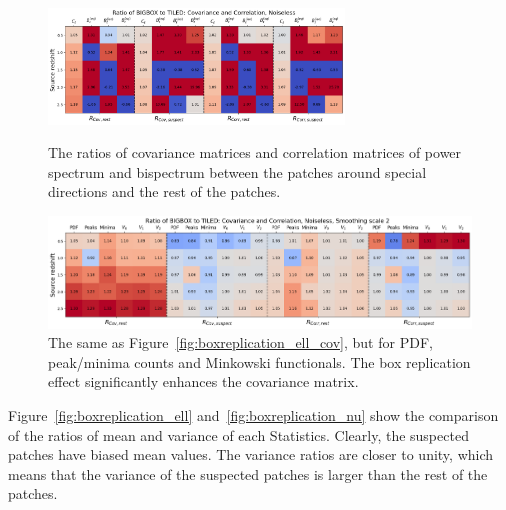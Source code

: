 \begin{figure}[ht]
    \centering
    \includegraphics[width=0.7\textwidth]{figures/BR/BR_ratio_ell_cov.png}
    \caption{The ratios of covariance matrices and correlation matrices of power spectrum and bispectrum between the patches around special directions and the rest of the patches. }
    \label{fig:boxreplication_ell_cov}
    \includegraphics[width=\textwidth]{figures/BR/BR_ratio_nu_cov.png}
    \caption{The same as Figure~\ref{fig:boxreplication_ell_cov}, but for PDF, peak/minima counts and Minkowski functionals. The box replication effect significantly enhances the covariance matrix.}
    \label{fig:boxreplication_nu_cov}
\end{figure}

Figure~\ref{fig:boxreplication_ell} and~\ref{fig:boxreplication_nu} show the comparison of the ratios of mean and variance of each Statistics. Clearly, the suspected patches have biased mean values. The variance ratios are closer to unity, which means that the variance of the suspected patches is larger than the rest of the patches.

